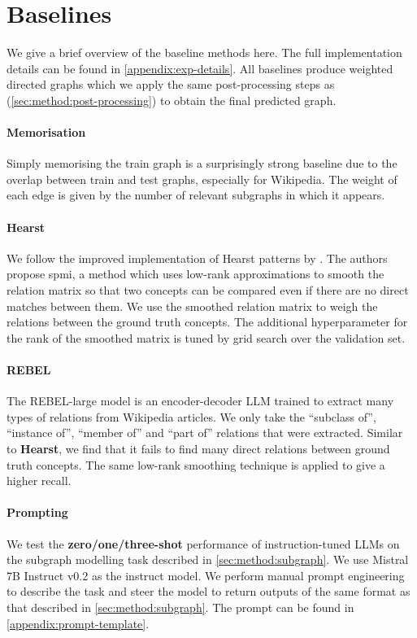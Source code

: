 \section{Baselines}  \label{sec:implementation:baselines}

We give a brief overview of the baseline methods here. The full implementation details can be found in \cref{appendix:exp-details}. All baselines produce weighted directed graphs which we apply the same post-processing steps as \name (\cref{sec:method:post-processing}) to obtain the final predicted graph.

\paragraph{Memorisation}
Simply memorising the train graph is a surprisingly strong baseline due to the overlap between train and test graphs, especially for Wikipedia. The weight of each edge is given by the number of relevant subgraphs in which it appears.

\paragraph{Hearst}
We follow the improved implementation of Hearst patterns by \citet{roller2018hearst}. The authors propose spmi, a method which uses low-rank approximations to smooth the relation matrix so that two concepts can be compared even if there are no direct matches between them. We use the smoothed relation matrix to weigh the relations between the ground truth concepts. The additional hyperparameter for the rank of the smoothed matrix is tuned by grid search over the validation set.

\paragraph{REBEL}
The REBEL-large model \cite{cabot2021rebel} is an encoder-decoder LLM trained to extract many types of relations from Wikipedia articles. We only take the ``subclass of'', ``instance of'', ``member of'' and ``part of'' relations that were extracted. Similar to \textbf{Hearst}, we find that it fails to find many direct relations between ground truth concepts. The same low-rank smoothing technique is applied to give a higher recall.

\paragraph{Prompting}
We test the \textbf{zero/one/three-shot} performance of instruction-tuned LLMs on the subgraph modelling task described in \cref{sec:method:subgraph}. We use Mistral 7B Instruct v0.2 \cite{jiang2023mistral} as the instruct model. We perform manual prompt engineering to describe the task and steer the model to return outputs of the same format as that described in \cref{sec:method:subgraph}. The prompt can be found in \cref{appendix:prompt-template}.


